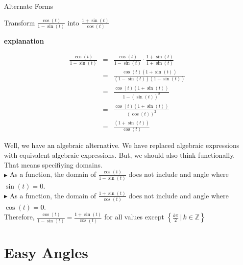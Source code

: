 \documentclass{ximera}
\begin{document}
\begin{example} Alternate Forms


Transform $\frac{\cos(t)}{1 - \sin(t)}$ into $\frac{1 + \sin(t)}{\cos(t)}$



\textbf{\textcolor{red!75!green}{explanation}} 

\begin{align*}
\frac{\cos(t)}{1 - \sin(t)}  &  = &  \frac{\cos(t)}{1 - \sin(t)}  \cdot \frac{1 + \sin(t)}{1 + \sin(t)}  \\
                           &  = &  \frac{\cos(t)(1 + \sin(t))}{(1 - \sin(t))(1 + \sin(t))}  \\
                           &  = &  \frac{\cos(t)(1 + \sin(t))}{1 - (\sin(t))^2}  \\
                           &  = &  \frac{\cos(t)(1 + \sin(t))}{(\cos(t))^2}  \\
                           &  = &  \frac{(1 + \sin(t))}{\cos(t)}  
\end{align*}





Well, we have an algebraic alternative.  We have replaced algebraic expressions with equivalent algebraic expressions.  But, we should also think functionally.  That means specifiying domains.  \\


$\blacktriangleright$ As a function, the domain of $\frac{\cos(t)}{1 - \sin(t)}$ does not include and angle where $\sin(t) = 0$. \\

$\blacktriangleright$ As a function, the domain of $\frac{1 + \sin(t)}{\cos(t)}$ does not include and angle where $\cos(t) = 0$. \\



Therefore, $\frac{\cos(t)}{1 - \sin(t)} = \frac{1 + \sin(t)}{\cos(t)}$ for all values except $\left\{   \frac{k \pi}{2} \, | \, k \in \mathbb{Z}      \right\}$

\end{example}










\section*{Easy Angles}
\end{document}
